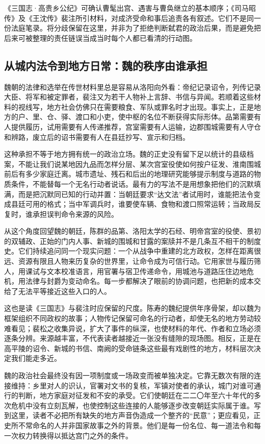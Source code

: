 \begin{textwindow}
《三国志·高贵乡公纪》可确认曹髦出宫、遇害与曹奂继立的基本顺序；《司马昭传》及《王沈传》裴注所引材料，对成济受命和事后追责各有叙述。它们不是同一份法庭笔录。将分歧保留在这里，并非为了拒绝判断弑君的政治后果，而是避免把后来可被整理的责任链误当成当时每个人都已看清的行动图。
\end{textwindow}

\subsection{从城内法令到地方日常：魏的秩序由谁承担}

魏朝的法律和选举在传世材料里总是容易从洛阳向外看：帝纪记录诏令，列传记录大臣、将军和被定罪者，裴注又为若干人物补上言辞、书信与异闻。若顺着这些材料的视线写，地方社会仿佛只在需要粮食、军队或罪名时才出现。事实上，正是地方的户、里、仓、驿、渡口和小吏，使中枢的名位不断获得实际形体。品第需要有人提供履历，试用需要有人传递推荐，宫室需要有人运输，边郡围城需要有人守仓和辨路，废立后的诏书需要有人在县廷抄写、宣示和归档。

这种承担不等于地方拥有统一的政治立场。魏的正史没有留下足以统计的县级档案，不能让我们说某地因九品而怎样分层、某次宫室役使如何按户征发、淮南围城前后有多少家庭迁离。城市遗址、残石和后出的地理研究能够提示制度与道路的物质条件，不能替每一个无名行动者说话。最有力的写法不是用想象把他们的沉默填满，而是把沉默同已知的行动并置：当朝廷要求“达文法”者试用时，谁能把法令变成县廷可用的格式；当中军调兵时，谁要使车辆、食物和渡口照常运转；当政局反复时，谁承担误判命令来源的风险。

从这个角度回望魏的朝廷，陈群的品第、洛阳太学的石经、明帝宫室的役使、景初的双辅政、正始的门内人事、新城的围城和甘露的案牍并不是几条互不相干的制度史。它们持续追问同一个现实问题：一个从战争中重建的北方政权，怎样在距离很远、资源有限且人物来历复杂的世界里，让命令成为可信行动。它用家世与履历筛人，用课试与文本校准语言，用官署与宿卫传递命令，用城池与道路压住边地危机，用法律与封爵为变动命名。每一步都解决了眼前的协调问题，也把新的成本交给了无法平等接近这些入口的人。

这也是读《三国志》与裴注时应保留的尺度。陈寿的魏纪提供年序骨架，却以魏为框架组织不同政权的故事；人物传记保留可命名的行动者，却使无名的地方劳动较难看见；裴松之收集异说，扩大了事件的纵深，也使材料的年代、作者和立场必须逐条分辨。来源越丰富，不代表读者越接近一张没有缝隙的现场图。相反，正是在高平陵的诏令、新城的书信、南阙的受命链条这些最有戏剧性的地方，材料层次决定我们能走多近。

魏的政治社会最终没有因一项制度或一场政变而被单独决定。它靠无数次有限的连接维持：乡里对人的识认，官署对文书的复核，军镇对使者的承认，城门对谁可通行的判断，地方家庭对征发和不安的承受。它们使朝廷在二二〇年至六十年代的多次危机中没有立刻瓦解，也使控制这些连接的人能够逐步改变朝廷实际属于谁。写到这里，读者不必把所有缺失的地方声音伪造成一个整齐的“民意”；更应看见，正史所不常命名的人并非国家故事之外的背景。他们是每一份名位、每一道法令和每一次权力转换得以抵达宫门之外的条件。
